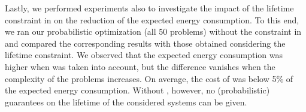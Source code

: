 Lastly, we performed experiments also to investigate the impact of the lifetime constraint in  on the reduction of the expected energy consumption.
To this end, we ran our probabilistic optimization (all 50 problems) without the constraint in  and compared the corresponding results with those obtained considering the lifetime constraint.
We observed that the expected energy consumption was higher when  was taken into account, but the difference vanishes when the complexity of the problems increases.
On average, the cost of  was below 5\% of the expected energy consumption.
Without , however, no (probabilistic) guarantees on the lifetime of the considered systems can be given.
